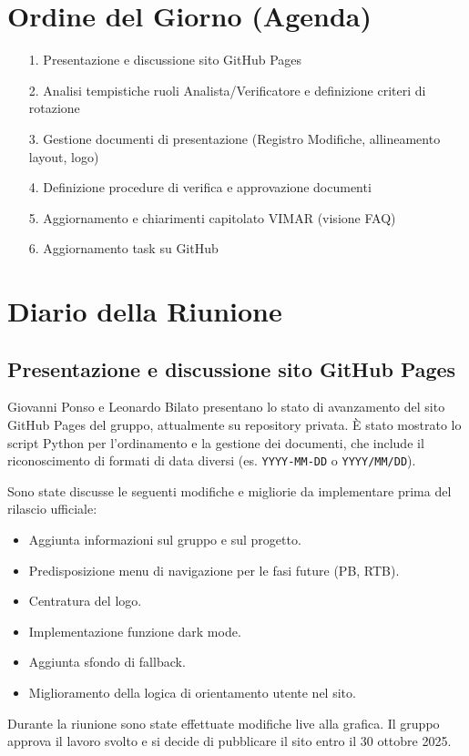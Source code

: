 \documentclass[a4paper, 11pt, oneside]{scrartcl} %
\begin{document}
\section{Ordine del Giorno (Agenda)}
\begin{itemize}
    \item[1.] Presentazione e discussione sito GitHub Pages
    \item[2.] Analisi tempistiche ruoli Analista/Verificatore e definizione criteri di rotazione
    \item[3.] Gestione documenti di presentazione (Registro Modifiche, allineamento layout, logo)
    \item[4.] Definizione procedure di verifica e approvazione documenti
    \item[5.] Aggiornamento e chiarimenti capitolato VIMAR (visione FAQ)
    \item[6.] Aggiornamento task su GitHub
\end{itemize}

\newpage
\section{Diario della Riunione}

\subsection{Presentazione e discussione sito GitHub Pages}
Giovanni Ponso e Leonardo Bilato presentano lo stato di avanzamento del sito GitHub Pages del gruppo, attualmente su repository privata.
È stato mostrato lo script Python per l'ordinamento e la gestione dei documenti, che include il riconoscimento di formati di data diversi (es. \texttt{YYYY-MM-DD} o \texttt{YYYY/MM/DD}).

Sono state discusse le seguenti modifiche e migliorie da implementare prima del rilascio ufficiale:
\begin{itemize}
    \item Aggiunta informazioni sul gruppo e sul progetto.
    \item Predisposizione menu di navigazione per le fasi future (PB, RTB).
    \item Centratura del logo.
    \item Implementazione funzione dark mode.
    \item Aggiunta sfondo di fallback.
    \item Miglioramento della logica di orientamento utente nel sito.
\end{itemize}
Durante la riunione sono state effettuate modifiche live alla grafica. Il gruppo approva il lavoro svolto e si decide di pubblicare il sito entro il 30 ottobre 2025.
\end{document}
